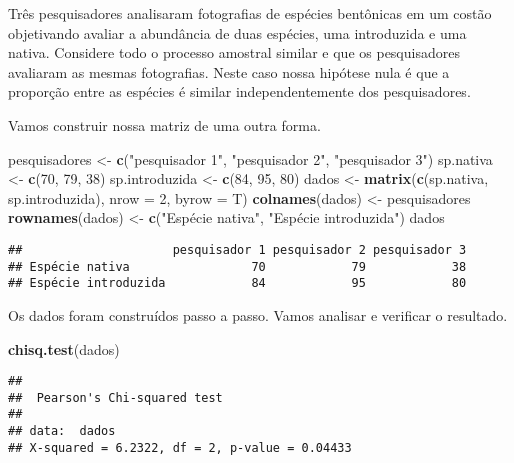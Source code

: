 \documentclass[14pt,titlepage, oneside, openany, a4paper]{book}
\newenvironment{Shaded}{\begin{snugshade}}{\end{snugshade}}
\newcommand{\DataTypeTok}[1]{\textcolor[rgb]{0.13,0.29,0.53}{#1}}
\newcommand{\DecValTok}[1]{\textcolor[rgb]{0.00,0.00,0.81}{#1}}
\newcommand{\KeywordTok}[1]{\textcolor[rgb]{0.13,0.29,0.53}{\textbf{#1}}}
\newcommand{\NormalTok}[1]{#1}
\newcommand{\StringTok}[1]{\textcolor[rgb]{0.31,0.60,0.02}{#1}}
\begin{document}
Três pesquisadores analisaram fotografias de espécies bentônicas em um costão objetivando avaliar a abundância de duas espécies, uma introduzida e uma nativa. Considere todo o processo amostral similar e que os pesquisadores avaliaram as mesmas fotografias. Neste caso nossa hipótese nula é que a proporção entre as espécies é similar independentemente dos pesquisadores.

Vamos construir nossa matriz de uma outra forma.

\begin{Shaded}
\begin{Highlighting}[]
\NormalTok{pesquisadores <-}\StringTok{ }\KeywordTok{c}\NormalTok{(}\StringTok{"pesquisador 1"}\NormalTok{, }\StringTok{"pesquisador 2"}\NormalTok{, }\StringTok{"pesquisador 3"}\NormalTok{)}
\NormalTok{sp.nativa <-}\StringTok{ }\KeywordTok{c}\NormalTok{(}\DecValTok{70}\NormalTok{, }\DecValTok{79}\NormalTok{, }\DecValTok{38}\NormalTok{)}
\NormalTok{sp.introduzida <-}\StringTok{ }\KeywordTok{c}\NormalTok{(}\DecValTok{84}\NormalTok{, }\DecValTok{95}\NormalTok{, }\DecValTok{80}\NormalTok{)}
\NormalTok{dados <-}\StringTok{ }\KeywordTok{matrix}\NormalTok{(}\KeywordTok{c}\NormalTok{(sp.nativa, sp.introduzida), }\DataTypeTok{nrow =} \DecValTok{2}\NormalTok{, }\DataTypeTok{byrow =}\NormalTok{ T)}
\KeywordTok{colnames}\NormalTok{(dados) <-}\StringTok{ }\NormalTok{pesquisadores}
\KeywordTok{rownames}\NormalTok{(dados) <-}\StringTok{ }\KeywordTok{c}\NormalTok{(}\StringTok{"Espécie nativa"}\NormalTok{, }\StringTok{"Espécie introduzida"}\NormalTok{)}
\NormalTok{dados}
\end{Highlighting}
\end{Shaded}

\begin{verbatim}
##                     pesquisador 1 pesquisador 2 pesquisador 3
## Espécie nativa                 70            79            38
## Espécie introduzida            84            95            80
\end{verbatim}

Os dados foram construídos passo a passo. Vamos analisar e verificar o resultado.

\begin{Shaded}
\begin{Highlighting}[]
\KeywordTok{chisq.test}\NormalTok{(dados)}
\end{Highlighting}
\end{Shaded}

\begin{verbatim}
## 
##  Pearson's Chi-squared test
## 
## data:  dados
## X-squared = 6.2322, df = 2, p-value = 0.04433
\end{verbatim}
\end{document}
